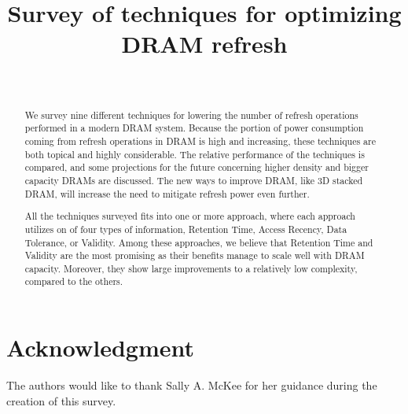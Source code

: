 \documentclass[journal, a4paper]{IEEEtran}
\begin{document}
\title{Survey of techniques for optimizing DRAM refresh}

\author{\\
}

\maketitle


\begin{abstract}
We survey nine different techniques for lowering the number of refresh operations performed in a modern DRAM system. Because the portion of power consumption coming from refresh operations in DRAM is high and increasing, these techniques are both topical and highly considerable. The relative performance of the techniques is compared, and some projections for the future concerning higher density and bigger capacity DRAMs are discussed. The new ways to improve DRAM, like 3D stacked DRAM, will increase the need to mitigate refresh power even further.

All the techniques surveyed fits into one or more approach, where each approach utilizes on of four types of information, Retention Time, Access Recency, Data Tolerance, or Validity. Among these approaches, we believe that Retention Time and Validity are the most promising as their benefits manage to scale well with DRAM capacity. Moreover, they show large improvements to a relatively low complexity, compared to the others.
\end{abstract}







\section*{Acknowledgment}
The authors would like to thank Sally A. McKee for her guidance during the creation of this survey.



\IEEEtriggercmd{\newpage}




\end{document}
